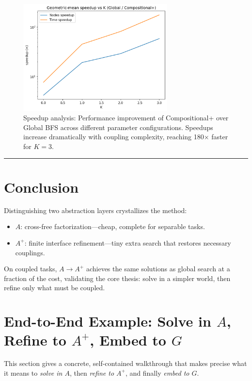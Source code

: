 \documentclass[11pt]{article}
\begin{document}
\begin{figure}[h]
\centering
\includegraphics[width=0.7\textwidth]{speedup_vs_k.png}
\caption{Speedup analysis: Performance improvement of Compositional+ over Global BFS across different parameter configurations. Speedups increase dramatically with coupling complexity, reaching 180× faster for $K=3$.}
\label{fig:speedup}
\end{figure}

\vspace{6pt}\noindent\rule{\textwidth}{0.4pt}\vspace{6pt}

\section{Conclusion}

Distinguishing two abstraction layers crystallizes the method:
\begin{itemize}
    \item $A$: cross-free factorization---cheap, complete for separable tasks.
    \item $A^{+}$: finite interface refinement---tiny extra search that restores necessary couplings.
\end{itemize}

On coupled tasks, $A\to A^{+}$ achieves the same solutions as global search at a fraction of the cost, validating the core thesis: solve in a simpler world, then refine only what must be coupled.


\section{End-to-End Example: Solve in $A$, Refine to $A^{+}$, Embed to $G$}

This section gives a concrete, self-contained walkthrough that makes precise what it means to
\emph{solve in $A$}, then \emph{refine to $A^{+}$}, and finally \emph{embed to $G$}.
\end{document}

